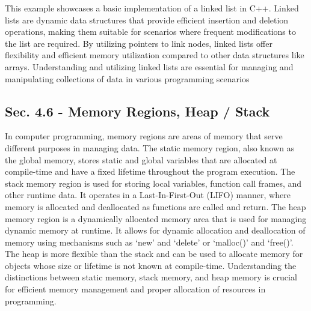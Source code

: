 \begin{solution}
    This example showcases a basic implementation of a linked list in C++. Linked lists are dynamic data structures that provide efficient insertion and deletion operations, making them suitable for scenarios where frequent modifications to the list are 
    required. By utilizing pointers to link nodes, linked lists offer flexibility and efficient memory utilization compared to other data structures like arrays. Understanding and utilizing linked lists are essential for managing and manipulating collections 
    of data in various programming scenarios
\end{solution}

\subsection*{Sec. 4.6 - Memory Regions, Heap / Stack}

In computer programming, memory regions are areas of memory that serve different purposes in managing data. The static memory region, also known as the global memory, stores static and global variables that are allocated at compile-time and have a fixed 
lifetime throughout the program execution. The stack memory region is used for storing local variables, function call frames, and other runtime data. It operates in a Last-In-First-Out (LIFO) manner, where memory is allocated and deallocated as functions 
are called and return. The heap memory region is a dynamically allocated memory area that is used for managing dynamic memory at runtime. It allows for dynamic allocation and deallocation of memory using mechanisms such as `new' and `delete' or `malloc()' 
and `free()'. The heap is more flexible than the stack and can be used to allocate memory for objects whose size or lifetime is not known at compile-time. Understanding the distinctions between static memory, stack memory, and heap memory is crucial for 
efficient memory management and proper allocation of resources in programming.


